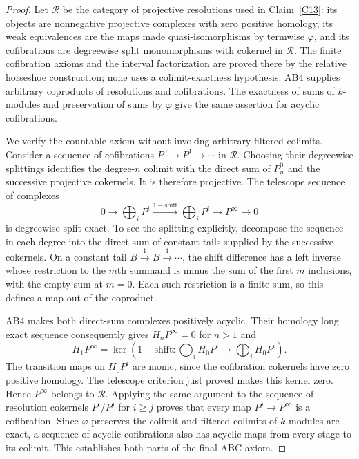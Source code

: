 \begin{proof}
Let $\mathcal R$ be the category of projective resolutions used in Claim~\ref{C13}: its objects are nonnegative projective complexes with zero positive homology, its weak equivalences are the maps made quasi-isomorphisms by termwise $\varphi$, and its cofibrations are degreewise split monomorphisms with cokernel in $\mathcal R$. The finite cofibration axioms and the interval factorization are proved there by the relative horseshoe construction; none uses a colimit-exactness hypothesis. AB4 supplies arbitrary coproducts of resolutions and cofibrations. The exactness of sums of $k$-modules and preservation of sums by $\varphi$ give the same assertion for acyclic cofibrations.

We verify the countable axiom without invoking arbitrary filtered colimits. Consider a sequence of cofibrations $P^0\to P^1\to\cdots$ in $\mathcal R$. Choosing their degreewise splittings identifies the degree-$n$ colimit with the direct sum of $P^0_n$ and the successive projective cokernels. It is therefore projective. The telescope sequence of complexes
\[
 0\longrightarrow\bigoplus_iP^i
 \xrightarrow{1-\mathrm{shift}}\bigoplus_iP^i
 \longrightarrow P^{\infty}\longrightarrow0
\]
is degreewise split exact. To see the splitting explicitly, decompose the sequence in each degree into the direct sum of constant tails supplied by the successive cokernels. On a constant tail $B\xrightarrow{1}B\xrightarrow{1}\cdots$, the shift difference has a left inverse whose restriction to the $m$th summand is minus the sum of the first $m$ inclusions, with the empty sum at $m=0$. Each such restriction is a finite sum, so this defines a map out of the coproduct.

AB4 makes both direct-sum complexes positively acyclic. Their homology long exact sequence consequently gives $H_nP^{\infty}=0$ for $n>1$ and
\[
 H_1P^{\infty}
 =\ker\left(1-\mathrm{shift}:\bigoplus_iH_0P^i
                              \longrightarrow\bigoplus_iH_0P^i\right).
\]
The transition maps on $H_0P^i$ are monic, since the cofibration cokernels have zero positive homology. The telescope criterion just proved makes this kernel zero. Hence $P^{\infty}$ belongs to $\mathcal R$. Applying the same argument to the sequence of resolution cokernels $P^i/P^j$ for $i\geq j$ proves that every map $P^j\to P^{\infty}$ is a cofibration. Since $\varphi$ preserves the colimit and filtered colimits of $k$-modules are exact, a sequence of acyclic cofibrations also has acyclic maps from every stage to its colimit. This establishes both parts of the final ABC axiom.


\end{proof}
